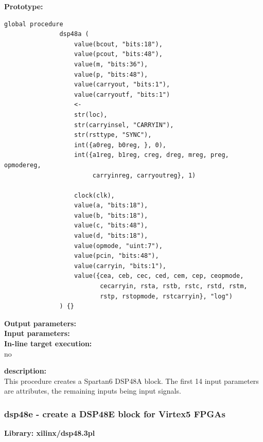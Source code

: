             {\bf Prototype:} \\
            \vsp
            \begin{lstlisting}[gobble=12, language=threepl]
               global procedure
               dsp48a (
                   value(bcout, "bits:18"),
                   value(pcout, "bits:48"),
                   value(m, "bits:36"),
                   value(p, "bits:48"),
                   value(carryout, "bits:1"),
                   value(carryoutf, "bits:1")
                   <-   
                   str(loc),
                   str(carryinsel, "CARRYIN"),
                   str(rsttype, "SYNC"),
                   int({a0reg, b0reg, }, 0),
                   int({a1reg, b1reg, creg, dreg, mreg, preg, opmodereg,
                        carryinreg, carryoutreg}, 1)

                   clock(clk),
                   value(a, "bits:18"),
                   value(b, "bits:18"),
                   value(c, "bits:48"),
                   value(d, "bits:18"),
                   value(opmode, "uint:7"),
                   value(pcin, "bits:48"),
                   value(carryin, "bits:1"),
                   value({cea, ceb, cec, ced, cem, cep, ceopmode,
                          cecarryin, rsta, rstb, rstc, rstd, rstm,
                          rstp, rstopmode, rstcarryin}, "log")
               ) {}
            \end{lstlisting}

            {\bf Output parameters:} \\

            {\bf Input parameters:} \\

            {\bf In-line target execution:} \\
            no

            {\bf description:} \\
            This procedure creates a Spartan6 DSP48A block. The first 14 input
            parameters are attributes, the remaining inputs being input signals.


        \subsubsection{dsp48e - create a DSP48E block for Virtex5 FPGAs}\label{sec:lpdsp48e}

            {\bf Library: xilinx/dsp48.3pl}


